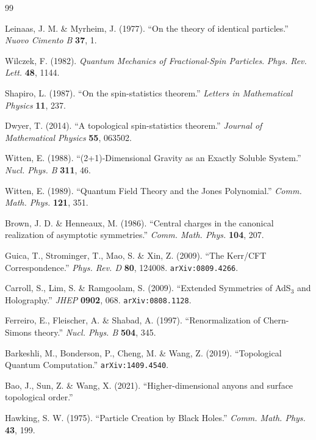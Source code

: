 \documentclass[11pt,a4paper]{article}
\begin{document}
\begin{thebibliography}{99}

Leinaas, J. M. \& Myrheim, J. (1977).
``On the theory of identical particles.''
\textit{Nuovo Cimento B} \textbf{37}, 1.

Wilczek, F. (1982).
\textit{Quantum Mechanics of Fractional-Spin Particles}.
\textit{Phys. Rev. Lett.} \textbf{48}, 1144.

Shapiro, L. (1987).
``On the spin-statistics theorem.''
\textit{Letters in Mathematical Physics} \textbf{11}, 237.

Dwyer, T. (2014).
``A topological spin-statistics theorem.''
\textit{Journal of Mathematical Physics} \textbf{55}, 063502.

Witten, E. (1988).
``(2+1)-Dimensional Gravity as an Exactly Soluble System.''
\textit{Nucl. Phys. B} \textbf{311}, 46.

Witten, E. (1989).
``Quantum Field Theory and the Jones Polynomial.''
\textit{Comm. Math. Phys.} \textbf{121}, 351.

Brown, J. D. \& Henneaux, M. (1986).
``Central charges in the canonical realization of asymptotic symmetries.''
\textit{Comm. Math. Phys.} \textbf{104}, 207.

Guica, T., Strominger, T., Mao, S. \& Xin, Z. (2009).
``The Kerr/CFT Correspondence.''
\textit{Phys. Rev. D} \textbf{80}, 124008.
\texttt{arXiv:0809.4266}.

Carroll, S., Lim, S. \& Ramgoolam, S. (2009).
``Extended Symmetries of AdS$_3$ and Holography.''
\textit{JHEP} \textbf{0902}, 068.
\texttt{arXiv:0808.1128}.

Ferreiro, E., Fleischer, A. \& Shabad, A. (1997).
``Renormalization of Chern-Simons theory.''
\textit{Nucl. Phys. B} \textbf{504}, 345.

Barkeshli, M., Bonderson, P., Cheng, M. \& Wang, Z. (2019).
``Topological Quantum Computation.''
\texttt{arXiv:1409.4540}.

Bao, J., Sun, Z. \& Wang, X. (2021).
``Higher-dimensional anyons and surface topological order.''

Hawking, S. W. (1975).
``Particle Creation by Black Holes.''
\textit{Comm. Math. Phys.} \textbf{43}, 199.

\end{thebibliography}
\end{document}

